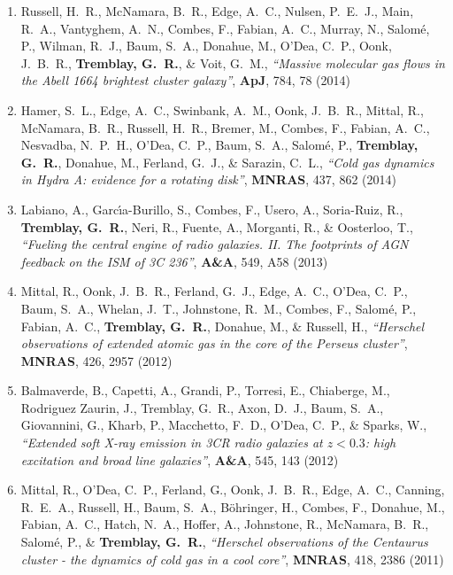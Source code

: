 \documentclass[11pt]{article}
\begin{document}
\begin{enumerate}[resume]
\item Russell, H.~R., McNamara, B.~R., Edge, A.~C., Nulsen, P.~E.~J., Main, 
R.~A., Vantyghem, A.~N., Combes, F., Fabian, A.~C., Murray, N., Salom\'{e}, P., 
Wilman, R.~J., Baum, S.~A., Donahue, M., O'Dea, C.~P., Oonk, J.~B.~R., 
{\bf Tremblay, G.~R.}, 
\& Voit, G.~M.,  {\it ``Massive molecular gas flows in the Abell 1664 brightest cluster galaxy''}, \textbf{ApJ}, 784, 78 (2014)



\item Hamer, S.~L., Edge, A.~C., Swinbank, A.~M., Oonk, J.~B.~R., Mittal, R., McNamara, B.~R., Russell, H.~R., Bremer, M., Combes, F., Fabian, A.~C., Nesvadba, N.~P.~H., O'Dea, C.~P., Baum, S.~A., Salom\'{e}, P., {\bf Tremblay, G.~R.}, Donahue, M., Ferland, G.~J., \& Sarazin, C.~L.,  {\it ``Cold gas dynamics in Hydra A: evidence for a rotating disk''}, \textbf{MNRAS}, 437, 862 (2014)




\item Labiano, A., Garc{\'{\i}}a-Burillo, S., Combes, F., Usero, A., 
Soria-Ruiz, R., {\bf Tremblay, G.~R.}, Neri, R., Fuente, A., Morganti, R., 
\& Oosterloo, T.,  {\it ``Fueling the central engine of radio galaxies. II. The footprints of AGN feedback on the ISM of 3C 236''}, \textbf{A\&A}, 549,  A58 (2013)


\item Mittal, R., Oonk, J.~B.~R., Ferland, G.~J., Edge, A.~C., O'Dea, C.~P., 
Baum, S.~A., Whelan, J.~T., Johnstone, R.~M., Combes, F., Salom{\'e}, P., 
Fabian, A.~C., {\bf Tremblay, G.~R.}, Donahue, M., 
\& Russell, H., {\it ``Herschel observations of extended atomic gas in the core of the Perseus cluster''}, \textbf{MNRAS}, 426,  2957 (2012)




\item Balmaverde, B., Capetti, A., Grandi, P., Torresi, E., Chiaberge, M., 
Rodriguez Zaurin, J., Tremblay, G.~R., Axon, D.~J., Baum, S.~A., 
Giovannini, G., Kharb, P., Macchetto, F.~D., O'Dea, C.~P., 
\& Sparks, W., {\it ``Extended soft X-ray emission in 3CR radio galaxies at $z< 0.3$: high excitation and broad line galaxies''}, \textbf{A\&A}, 545,  143 (2012)




\item Mittal, R., O'Dea, C.~P., Ferland, G., Oonk, J.~B.~R., Edge, A.~C., 
Canning, R.~E.~A., Russell, H., Baum, S.~A., B{\"o}hringer, H., Combes, F., 
Donahue, M., Fabian, A.~C., Hatch, N.~A., Hoffer, A., Johnstone, R., 
McNamara, B.~R., Salom{\'e}, P., 
\& {\bf Tremblay, G.~R.}, {\it ``Herschel observations of the Centaurus cluster - the dynamics of cold gas in a cool core''}, \textbf{MNRAS}, 418,  2386 (2011)


\end{enumerate}
\end{document}
